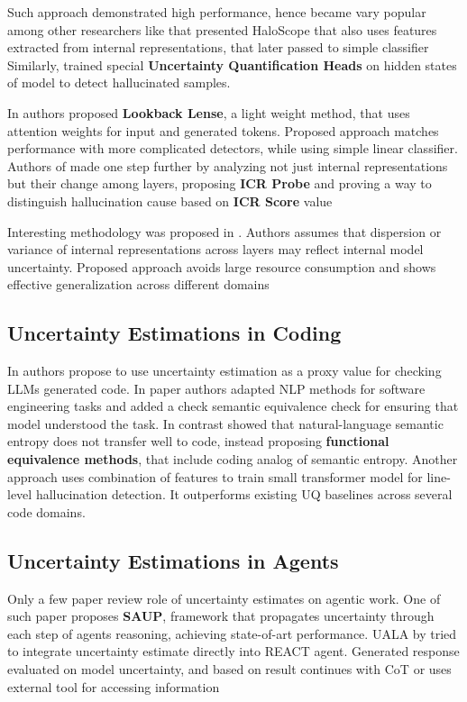 Such approach demonstrated high performance, hence became vary popular among other researchers like 
\cite{du2024haloscope} that presented HaloScope that also uses features extracted from internal representations, that later passed to simple classifier
Similarly, \cite{shelmanov2025head} trained special \textbf{Uncertainty Quantification Heads} on hidden states of model
to detect hallucinated samples.

In \cite{chuang2024lookback} authors proposed \textbf{Lookback Lense}, a light weight method, that
uses attention weights for input and generated tokens. Proposed approach
matches performance with more complicated detectors, while using simple linear classifier.
Authors of \cite{zhang2025icr} made one step further by analyzing not just internal representations but
their change among layers, proposing \textbf{ICR Probe} and proving a way to distinguish hallucination cause
based on \textbf{ICR Score} value

Interesting methodology was proposed in \cite{srey2026learning}. Authors assumes that dispersion or variance of internal representations across layers
may reflect internal model uncertainty. Proposed approach avoids large resource consumption and shows effective generalization across different domains

\subsection{Uncertainty Estimations in Coding}
In \cite{sharma2025assessingcorrectnessllmbasedcode} authors propose to use uncertainty estimation as a proxy value
for checking LLMs generated code. In paper authors adapted NLP methods for software engineering tasks
and  added a check semantic equivalence check for ensuring that model understood the task.
In contrast \cite{bouchard2026functional} showed that natural-language semantic entropy does not transfer well to code,
instead proposing \textbf{functional equivalence methods}, that include coding analog of semantic entropy.
Another approach \cite{andriushchenko2026efficient} uses combination of features to train small transformer model
for line-level hallucination detection. It outperforms existing UQ baselines across several code domains.

\subsection{Uncertainty Estimations in Agents}
Only a few paper review role of uncertainty estimates on agentic work. 
One of such paper \cite{zhao-etal-2025-uncertainty} proposes \textbf{SAUP}, framework that propagates
uncertainty through each step of agents reasoning, achieving state-of-art performance.
UALA by \cite{han-etal-2024-towards} tried to integrate uncertainty estimate directly into REACT agent. Generated
response evaluated on model uncertainty, and based on result continues with CoT or uses external tool for accessing information

